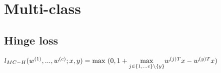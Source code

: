 \section*{Multi-class}
\subsection*{Hinge loss}
$l_{MC-H}(w^{(1)},...,w^{(c)};x,y) =\\
\text{max }(0,1+\underset{j\in\{1, \ldots c\} \backslash \{y\}}{\operatorname{max}} w^{(j)T} x - w^{(y)T} x)$
